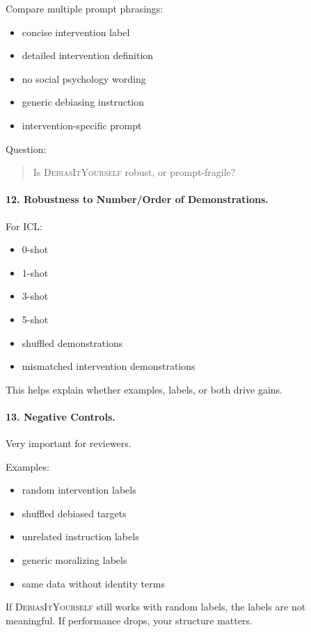 \documentclass[11pt]{article}
\newcommand{\diy}{\textsc{DebiasItYourself}}
\begin{document}
Compare multiple prompt phrasings:
\begin{itemize}[leftmargin=1.4em,itemsep=1pt,topsep=2pt]
    \item concise intervention label
    \item detailed intervention definition
    \item no social psychology wording
    \item generic debiasing instruction
    \item intervention-specific prompt
\end{itemize}

Question:
\begin{quote}
Is \diy{} robust, or prompt-fragile?
\end{quote}

\paragraph{12. Robustness to Number/Order of Demonstrations.}
For ICL:
\begin{itemize}[leftmargin=1.4em,itemsep=1pt,topsep=2pt]
    \item 0-shot
    \item 1-shot
    \item 3-shot
    \item 5-shot
    \item shuffled demonstrations
    \item mismatched intervention demonstrations
\end{itemize}
This helps explain whether examples, labels, or both drive gains.

\paragraph{13. Negative Controls.}
Very important for reviewers.

Examples:
\begin{itemize}[leftmargin=1.4em,itemsep=1pt,topsep=2pt]
    \item random intervention labels
    \item shuffled debiased targets
    \item unrelated instruction labels
    \item generic moralizing labels
    \item same data without identity terms
\end{itemize}
If \diy{} still works with random labels, the labels are not meaningful. If performance drops, your structure matters.
\end{document}
